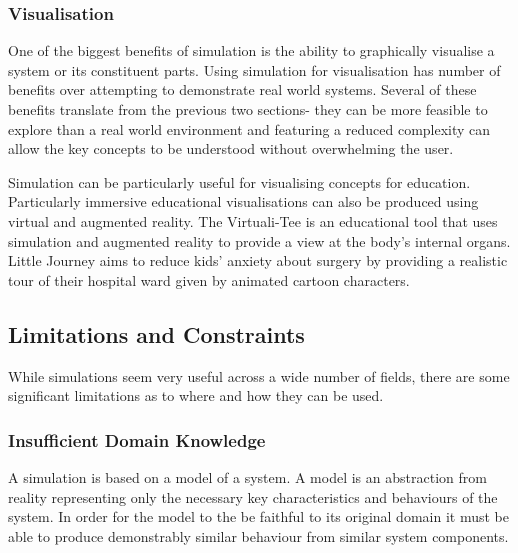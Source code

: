 \documentclass{UoYCSproject}
\begin{document}
\subsubsection{Visualisation}
\label{visualisation}
One of the biggest benefits of simulation is the ability to graphically visualise a system or its constituent parts.
Using simulation for visualisation has number of benefits over attempting to demonstrate real world systems.
Several of these benefits translate from the previous two sections- they can be more feasible to explore than a real world environment and featuring a reduced complexity can allow the key concepts to be understood without overwhelming the user.

Simulation can be particularly useful for visualising concepts for education. 
Particularly immersive educational visualisations can also be produced using virtual and augmented reality.
The Virtuali-Tee is an educational tool that uses simulation and augmented reality to provide a view at the body's internal organs\cite{curiscope}.
Little Journey aims to reduce kids' anxiety about surgery by providing a realistic tour of their hospital ward given by animated cartoon characters\cite{little_journey}.



\subsection{Limitations and Constraints}
While simulations seem very useful across a wide number of fields, there are some significant limitations as to where and how they can be used.

\subsubsection{Insufficient Domain Knowledge}
\label{domain_knowledge}
A simulation is based on a model of a system.
A model is an abstraction from reality representing only the necessary key characteristics and behaviours of the system.
In order for the model to the be faithful to its original domain it must be able to produce demonstrably similar behaviour from similar system components.
\end{document}
